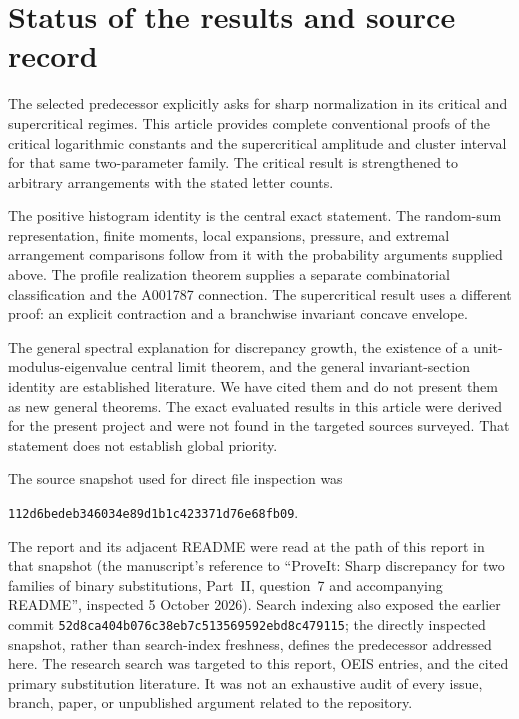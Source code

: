 \documentclass[11pt]{article}
\numberwithin{equation}{section}
\theoremstyle{definition}
\theoremstyle{remark}
\begin{document}
\section{Status of the results and source record}
\label{bmf:sec:status}

The selected predecessor explicitly asks for sharp normalization
in its critical and supercritical regimes. This article provides
complete conventional proofs of the critical logarithmic constants
and the supercritical amplitude and cluster interval for that
same two-parameter family. The critical result is strengthened
to arbitrary arrangements with the stated letter counts.

The positive histogram identity is the central exact statement.
The random-sum representation, finite moments, local expansions,
pressure, and extremal arrangement comparisons follow from it
with the probability arguments supplied above. The profile
realization theorem supplies a separate combinatorial
classification and the A001787 connection. The supercritical
result uses a different proof: an explicit contraction and a
branchwise invariant concave envelope.

The general spectral explanation for discrepancy growth, the
existence of a unit-modulus-eigenvalue central limit theorem,
and the general invariant-section identity are established
literature. We have cited them and do not present them as
new general theorems. The exact evaluated results in this
article were derived for the present project and were not
found in the targeted sources surveyed. That statement does
not establish global priority.

The source snapshot used for direct file inspection was
\begin{center}
\texttt{112d6bedeb346034e89d1b1c423371d76e68fb09}.
\end{center}
The report and its adjacent README were read at the path
of this report in that snapshot (the manuscript's reference to
``ProveIt: Sharp discrepancy for two families of binary substitutions,
Part~II, question~7 and accompanying README'', inspected 5 October 2026).
Search indexing also exposed
the earlier commit
\texttt{52d8ca404b076c38eb7c513569592ebd8c479115};
the directly inspected snapshot, rather than search-index
freshness, defines the predecessor addressed here.
The research search was targeted to this report, OEIS entries,
and the cited primary substitution literature. It was not an
exhaustive audit of every issue, branch, paper, or unpublished
argument related to the repository.
\end{document}

